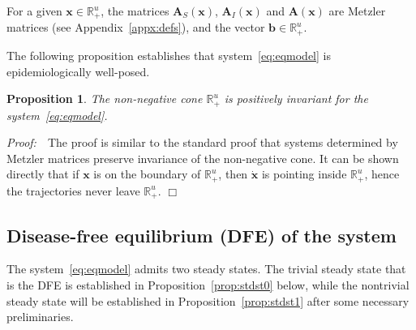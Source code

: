 \documentclass[a4paper]{article}
\newcommand{\edem}{\hfill $\Box$ }
\newtheorem{prop}{Proposition}[section]
\begin{document}
For a given $\mathbf
x\in\mathbb
R^u_+$, the matrices  $\mathbf A_S(\mathbf x)$, $\mathbf A_I(\mathbf x)$ and $\mathbf A(\mathbf x)$ are Metzler matrices (see Appendix~\ref{appx:defs}), and the vector  $\mathbf b  \in \mathbb R_+^u$.


\noindent The following proposition establishes that  system~\eqref{eq:eqmodel} is epidemiologically well-posed. 
\begin{prop}\label{prop:invrnce} The non-negative cone $\mathbb R^u_+$  is positively invariant for
the system~\eqref{eq:eqmodel}.\end{prop}

\noindent \emph{Proof:}~~The proof is similar to the standard proof that systems determined by  Metzler matrices preserve invariance of the non-negative cone. It can be shown directly that if $\mathbf x$ is on the boundary of $\mathbb R_+^u$, then $\dot{\mathbf x}$ is pointing inside $\mathbb R_+^u$, hence the trajectories never leave $\mathbb R_+^u$.
\edem


\subsection{Disease-free equilibrium (DFE) of the system} 
The system~\eqref{eq:eqmodel} admits two steady states. The trivial steady state that is the DFE is established in  Proposition~\ref{prop:stdst0} below, while the nontrivial steady state will be established in Proposition~\ref{prop:stdst1} after some necessary preliminaries. %
\end{document}
